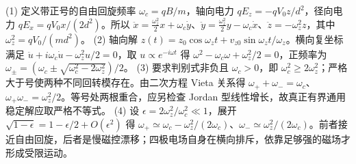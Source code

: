 (1) 定义带正号的自由回旋频率 \(\omega_c=qB/m\)，轴向电力 \(qE_z=-qV_0 z/d^2\)，径向电力 \(qE_x=qV_0x/(2d^2)\)。所以 \(\ddot x=\frac{\omega_z^2}{2}x+\omega_c\dot y\)、\(\ddot y=\frac{\omega_z^2}{2}y-\omega_c\dot x\)、\(\ddot z=-\omega_z^2z\)，其中 \(\omega_z^2=qV_0/(md^2)\)。
(2) 轴向解 \(z(t)=z_0\cos\omega_zt+v_{z0}\sin\omega_zt/\omega_z\)。横向复坐标满足 \(\ddot u+i\omega_c\dot u-\omega_z^2u/2=0\)，取 \(u\propto e^{-i\omega t}\) 得 \(\omega^2-\omega_c\omega+\omega_z^2/2=0\)，正频率为 \(\omega_\pm=(\omega_c\pm\sqrt{\omega_c^2-2\omega_z^2})/2\)。
(3) 要求判别式非负且 \(\omega_c>0\)，即 \(\omega_c^2\ge2\omega_z^2\)；严格大于号使两种不同回转模存在。由二次方程 Vieta 关系得 \(\omega_++\omega_-=\omega_c\)、\(\omega_+\omega_-=\omega_z^2/2\)。等号处两根重合，应另检查 Jordan 型线性增长，故真正有界通用稳定解应取严格不等式。
(4) 设 \(\epsilon=2\omega_z^2/\omega_c^2\ll1\)，展开 \(\sqrt{1-\epsilon}=1-\epsilon/2+O(\epsilon^2)\) 得 \(\omega_+\simeq\omega_c-\omega_z^2/(2\omega_c)\)、\(\omega_-\simeq\omega_z^2/(2\omega_c)\)。前者接近自由回旋，后者是慢磁控漂移；四极电场自身在横向排斥，依靠足够强的磁场才形成受限运动。
